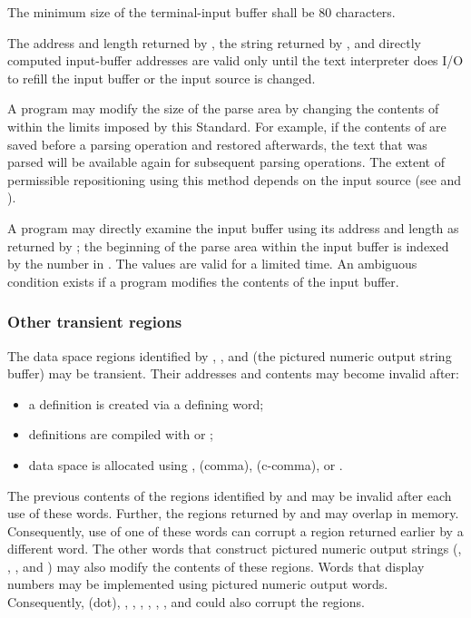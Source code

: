 The minimum size of the terminal-input buffer shall be 80
characters.

The address and length returned by , the string
returned by , and directly computed input-buffer
addresses are valid only until the text interpreter does I/O to
refill the input buffer or the input source is changed.

A program may modify the size of the parse area by changing the
contents of  within the limits imposed by this Standard.
For example, if the contents of  are saved before a
parsing operation and restored afterwards, the text that was parsed
will be available again for subsequent parsing operations. The
extent of permissible repositioning using this method depends on the
input source (see 
and ).

A program may directly examine the input buffer using its address
and length as returned by ; the beginning of the parse
area within the input buffer is indexed by the number in .
The values are valid for a limited time. An ambiguous condition
exists if a program modifies the contents of the input buffer.

\subsubsection{Other transient regions} %
\label{usage:transient}

The data space regions identified by , , and
 (the pictured numeric output string buffer) may be
transient. Their addresses and contents may become invalid after:

\begin{itemize}
\item a definition is created via a defining word;
\item definitions are compiled with \word{:} or ;
\item data space is allocated using , \word{,} (comma),
	 (c-comma), or .
\end{itemize}

The previous contents of the regions identified by  and
 may be invalid after each use of these words. Further,
the regions returned by  and  may overlap in
memory. Consequently, use of one of these words can corrupt a region
returned earlier by a different word. The other words that construct
pictured numeric output strings (, , ,
and )  may also modify the contents of these regions.
Words that display numbers may be implemented using pictured numeric
output words. Consequently,  (dot), ,
, , ,
, , and  could also corrupt
the regions.

